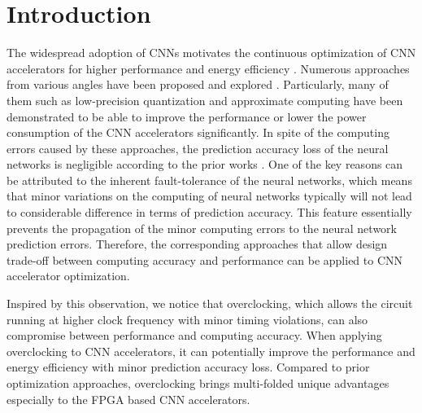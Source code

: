 \section{Introduction} \label{sec:intro}
The widespread adoption of CNNs motivates the 
continuous optimization of CNN accelerators for higher 
performance and energy efficiency
\cite{pipecnn_2,Qiu2016_10,Zeng2018_18}. 
Numerous approaches from various 
angles have been proposed and explored \cite{EIE_han_2016} \cite{deepburing_12}. 
Particularly, many of them such as 
low-precision quantization \cite{Hwang2014_17} \cite{Matthieu2014_8} 
and approximate computing \cite{Approximate_Multiplier_31} \cite{Approximate_32}
have been demonstrated to 
be able to improve the performance or lower the power consumption of the CNN 
accelerators significantly. In spite of the computing errors caused by these approaches, 
the prediction accuracy loss of the neural networks is negligible according to the prior works \cite{deep_compress_han_2015}.
One of the key reasons can be attributed to the inherent fault-tolerance of 
the neural networks, which means that minor variations on the 
computing of neural networks typically will not lead to considerable 
difference in terms of prediction accuracy. This 
feature essentially prevents the propagation of 
the minor computing errors to the neural network prediction errors. 
Therefore, the corresponding approaches that allow design trade-off 
between computing accuracy and performance can be applied to CNN 
accelerator optimization.

Inspired by this observation, we notice that overclocking, which 
allows the circuit running at higher clock frequency with minor 
timing violations, can also compromise between performance 
and computing accuracy. When applying overclocking to CNN accelerators, 
it can potentially improve the performance and energy 
efficiency with minor prediction accuracy loss.
Compared to prior optimization approaches, overclocking brings 
multi-folded unique advantages especially to the FPGA based CNN 
accelerators. 

